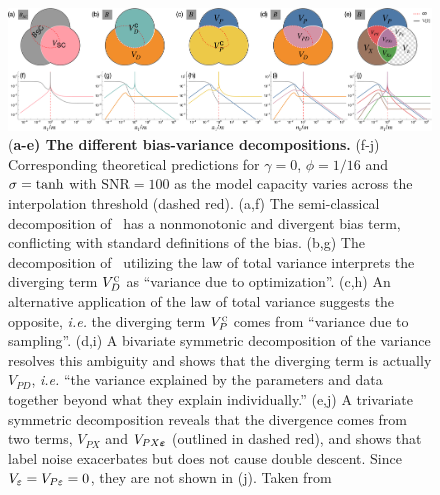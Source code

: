 \documentclass[10pt]{article}
\begin{document}
\begin{figure}[htb]
    \centering
\includegraphics[width=\linewidth]{pdf/VennFig2.pdf}
\caption{(\textbf{a-e) The different bias-variance decompositions.} (f-j) Corresponding theoretical predictions for $\gamma =0$, $\phi=1/16$ and $\sigma = \tanh$ with $\text{SNR} = 100$ as the model capacity varies across the interpolation threshold (dashed red). (a,f) The semi-classical decomposition of~\cite{hastie2019surprises,mei2019generalization} has a nonmonotonic and divergent bias term, conflicting with standard definitions of the bias. (b,g) The decomposition of~\cite{neal2018modern} utilizing the law of total variance interprets the diverging term $V_D^\textsc{c}$ as ``variance due to optimization''. (c,h) An alternative application of the law of total variance suggests the opposite, \emph{i.e.} the diverging term $V_P^\textsc{c}$ comes from ``variance due to sampling''. (d,i) A bivariate symmetric decomposition of the variance resolves this ambiguity and shows that the diverging term is actually $V_{PD}$, \emph{i.e.} ``the variance explained by the parameters and data together beyond what they explain individually.'' (e,j) A trivariate symmetric decomposition reveals that the divergence comes from two terms, $V_{PX}$ and $V_{PX\boldsymbol{\varepsilon}}$ (outlined in dashed red), and shows that label noise exacerbates but does not cause double descent. Since $V_{\varepsilon}=V_{P{\varepsilon}}=0$, they are not shown in (j). Taken from \cite{adlam2020understandingdoubledescentrequires}}
\label{fig:venn_variance}
\end{figure}
\end{document}
